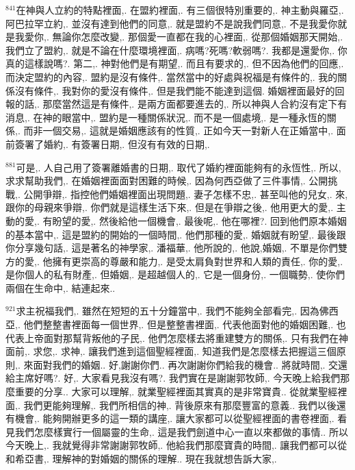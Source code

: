 \documentclass{book}
\begin{document}
$^{841}$在神與人立約的特點裡面,.
在盟約裡面,.
有三個很特別重要的,.
神主動與羅亞,.
阿巴拉罕立約,.
並沒有達到他們的同意,.
就是盟約不是說我們同意,.
不是我愛你就是我愛你,.
無論你怎麼改變,.
那個愛一直都在我的心裡面,.
從那個婚姻那天開始,.
我們立了盟約,.
就是不論在什麼環境裡面,.
病嗎?死嗎?軟弱嗎?.
我都是還愛你,.
你真的這樣說嗎?.
第二,.
神對他們是有期望,.
而且有要求的,.
但不因為他們的回應,.
而決定盟約的內容,.
盟約是沒有條件,.
當然當中的好處與祝福是有條件的,.
我的關係沒有條件,.
我對你的愛沒有條件,.
但是我們能不能達到這個.
婚姻裡面最好的回報的話,.
那麼當然這是有條件,.
是兩方面都要進去的,.
所以神與人合約沒有定下有消息,.
在神的眼當中,.
盟約是一種關係狀況,.
而不是一個處境,.
是一種永恆的關係,.
而非一個交易,.
這就是婚姻應該有的性質,.
正如今天一對新人在正婚當中,.
面前簽署了婚約,.
有簽署日期,.
但沒有有效的日期,.

$^{881}$可是,.
人自己用了簽署離婚書的日期,.
取代了婚約裡面能夠有的永恆性,.
所以,求求幫助我們,.
在婚姻裡面面對困難的時候,.
因為何西亞做了三件事情,.
公開挑戰,.
公開爭辯,.
指控他們婚姻裡面出現問題,.
妻子怎樣不忠,.
甚至叫他的兒女,.
來,跟你的母親來爭辯,.
你們就是這樣生活下來,.
但是在爭辯之後,.
他用更大的愛,.
主動的愛,.
有盼望的愛,.
然後給他一個機會,.
最後呢,.
他在哪裡?.
回到他們原本婚姻的基本當中,.
這是盟約的開始的一個時間,.
他們那種的愛,.
婚姻就有盼望,.
最後跟你分享幾句話,.
這是著名的神學家,.
潘福華,.
他所說的,.
他說,婚姻,.
不單是你們雙方的愛,.
他擁有更崇高的尊嚴和能力,.
是受太肩負對世界和人類的責任,.
你的愛,.
是你個人的私有財產,.
但婚姻,.
是超越個人的,.
它是一個身份,.
一個職勢,.
使你們兩個在生命中,.
結連起來..

$^{921}$求主祝福我們,.
雖然在短短的五十分鐘當中,.
我們不能夠全部看完,.
因為佛西亞,.
他們整整書裡面每一個世界,.
但是整整書裡面,.
代表他面對他的婚姻困難,.
也代表上帝面對那幫背叛他的子民,.
他們怎麼樣去將重建雙方的關係,.
只有我們在神面前,.
求您,.
求神,.
讓我們進到這個聖經裡面,.
知道我們是怎麼樣去把握這三個原則,.
來面對我們的婚姻..
好,謝謝你們..
再次謝謝你們給我的機會..
將就時間,.
交還給主席好嗎?.
好,.
大家看見我沒有嗎?.
我們實在是謝謝郭牧師,.
今天晚上給我們那麼重要的分享..
大家可以理解,.
就業聖經裡面其實真的是非常寶貴..
從就業聖經裡面,.
我們更能夠理解,.
我們所相信的神,.
背後原來有那麼豐富的意義..
我們以後還有機會,.
能夠開辦更多的這一類的講座,.
讓大家都可以從聖經裡面的書卷裡面,.
看見我們怎麼樣實行一個屬靈的生命,.
這是我們劍道中心一直以來都做的事情..
所以今天晚上,.
我就覺得非常謝謝郭牧師,.
他給我們那麼寶貴的時間,.
讓我們都可以從和希亞書,.
理解神的對婚姻的關係的理解..
現在我就想告訴大家,.
\end{document}
